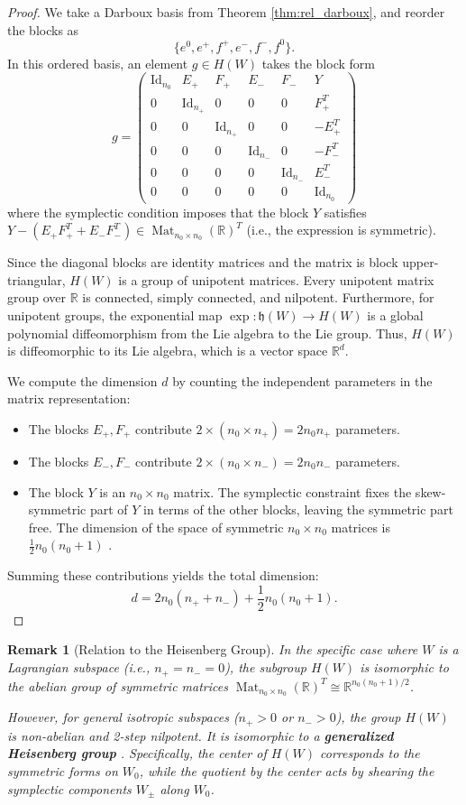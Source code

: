 \documentclass[12pt, final]{article}
\def\R{\mathbb{R}}
\def\Mat{\operatorname{Mat}}
\def\Id{\operatorname{Id}}
\newtheorem{remark}[theorem]{Remark}
\begin{document}
\begin{proof}
We take a Darboux basis from Theorem \ref{thm:rel_darboux}, and reorder the blocks as
\[ \{ e^0, e^+, f^+, e^-, f^-, f^0\}.\]
In this ordered basis, an element $g \in H(W)$ takes the block form
\[
g = \begin{pmatrix}
\Id_{n_0} & E_+ & F_+ & E_- & F_- & Y \\
0 & \Id_{n_+} & 0 & 0 & 0 & F_+^T \\
0 & 0 & \Id_{n_+} & 0 & 0 & -E_+^T \\
0 & 0 & 0 & \Id_{n_-} & 0 & -F_-^T \\
0 & 0 & 0 & 0 & \Id_{n_-} & E_-^T \\
0 & 0 & 0 & 0 & 0 & \Id_{n_0}
\end{pmatrix}
\]
where the symplectic condition imposes that the block $Y$ satisfies $Y - (E_+ F_+^T + E_- F_-^T) \in \Mat_{n_0 \times n_0}(\R)^T$ (i.e., the expression is symmetric).

Since the diagonal blocks are identity matrices and the matrix is block upper-triangular, $H(W)$ is a group of unipotent matrices. Every unipotent matrix group over $\R$ is connected, simply connected, and nilpotent. Furthermore, for unipotent groups, the exponential map $\exp: \mathfrak{h}(W) \to H(W)$ is a global polynomial diffeomorphism from the Lie algebra to the Lie group. Thus, $H(W)$ is diffeomorphic to its Lie algebra, which is a vector space $\R^d$.

We compute the dimension $d$ by counting the independent parameters in the matrix representation:
\begin{itemize}
    \item The blocks $E_+, F_+$ contribute $2 \times (n_0 \times n_+) = 2n_0 n_+$ parameters.
    \item The blocks $E_-, F_-$ contribute $2 \times (n_0 \times n_-) = 2n_0 n_-$ parameters.
    \item The block $Y$ is an $n_0 \times n_0$ matrix. The symplectic constraint fixes the skew-symmetric part of $Y$ in terms of the other blocks, leaving the symmetric part free. The dimension of the space of symmetric $n_0 \times n_0$ matrices is $\frac{1}{2}n_0(n_0+1)$ .
\end{itemize}
Summing these contributions yields the total dimension:
\[
d = 2n_0(n_+ + n_-) + \frac{1}{2}n_0(n_0+1).
\]
\end{proof}

\begin{remark}[Relation to the Heisenberg Group]
In the specific case where $W$ is a Lagrangian subspace (i.e., $n_+ = n_- = 0$), the subgroup $H(W)$ is isomorphic to the abelian group of symmetric matrices $\Mat_{n_0 \times n_0}(\R)^T \cong \R^{n_0(n_0+1)/2}$.

However, for general isotropic subspaces ($n_+ > 0$ or $n_- > 0$), the group $H(W)$ is non-abelian and 2-step nilpotent. It is isomorphic to a \textbf{generalized Heisenberg group} \cite{Ziegler}. Specifically, the center of $H(W)$ corresponds to the symmetric forms on $W_0$, while the quotient by the center acts by shearing the symplectic components $W_\pm$ along $W_0$.
\end{remark}
\end{document}
